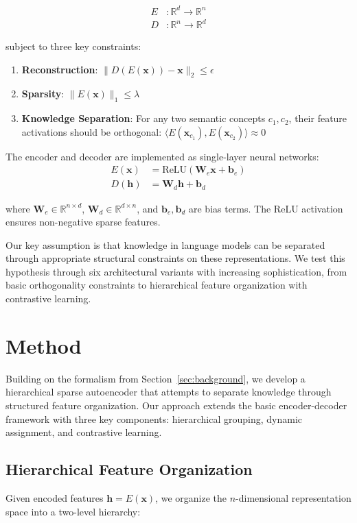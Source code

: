 \documentclass{article} %
\begin{document}
\begin{align*}
E &: \mathbb{R}^d \rightarrow \mathbb{R}^n \\
D &: \mathbb{R}^n \rightarrow \mathbb{R}^d
\end{align*}

subject to three key constraints:

\begin{enumerate}
    \item \textbf{Reconstruction}: $\|D(E(\mathbf{x})) - \mathbf{x}\|_2 \leq \epsilon$
    \item \textbf{Sparsity}: $\|E(\mathbf{x})\|_1 \leq \lambda$
    \item \textbf{Knowledge Separation}: For any two semantic concepts $c_1, c_2$, their feature activations should be orthogonal: $\langle E(\mathbf{x}_{c_1}), E(\mathbf{x}_{c_2}) \rangle \approx 0$
\end{enumerate}

The encoder and decoder are implemented as single-layer neural networks:
\begin{align*}
E(\mathbf{x}) &= \text{ReLU}(\mathbf{W}_e\mathbf{x} + \mathbf{b}_e) \\
D(\mathbf{h}) &= \mathbf{W}_d\mathbf{h} + \mathbf{b}_d
\end{align*}

where $\mathbf{W}_e \in \mathbb{R}^{n \times d}$, $\mathbf{W}_d \in \mathbb{R}^{d \times n}$, and $\mathbf{b}_e, \mathbf{b}_d$ are bias terms. The ReLU activation ensures non-negative sparse features.

Our key assumption is that knowledge in language models can be separated through appropriate structural constraints on these representations. We test this hypothesis through six architectural variants with increasing sophistication, from basic orthogonality constraints to hierarchical feature organization with contrastive learning.

\section{Method}
\label{sec:method}

Building on the formalism from Section~\ref{sec:background}, we develop a hierarchical sparse autoencoder that attempts to separate knowledge through structured feature organization. Our approach extends the basic encoder-decoder framework with three key components: hierarchical grouping, dynamic assignment, and contrastive learning.

\subsection{Hierarchical Feature Organization}
Given encoded features $\mathbf{h} = E(\mathbf{x})$, we organize the $n$-dimensional representation space into a two-level hierarchy:
\end{document}
